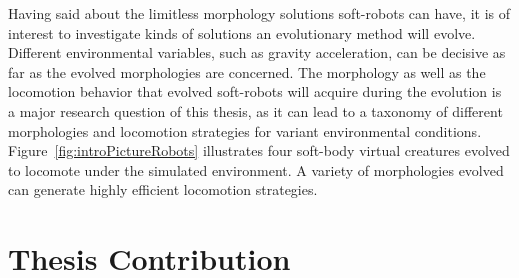 Having said about the limitless morphology solutions soft-robots can have, it is of interest to investigate kinds of solutions an evolutionary method will evolve. Different environmental variables, such as gravity acceleration, can be decisive as far as the evolved morphologies are concerned. The morphology as well as the locomotion behavior that evolved soft-robots will acquire during the evolution is a major research question of this thesis, as it can lead to a taxonomy of different morphologies and locomotion strategies for variant environmental conditions. Figure~\ref{fig:introPictureRobots} illustrates four soft-body virtual creatures evolved to locomote under the simulated environment. A variety of morphologies evolved can generate highly efficient locomotion strategies.


\section{Thesis Contribution}

